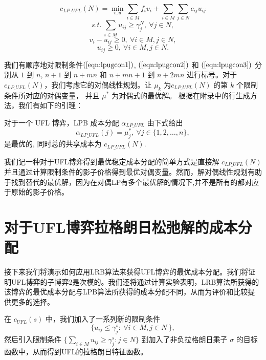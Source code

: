 \documentclass[UTF8]{article}
\begin{document}
\begin{定义}
\begin{equation*}\label{eqn:lpugobj}
c_{LP\_UFL}(N) = \min_{v,u} \sum_{i \in M} f_iv_i + \sum_{i \in M} \sum_{j \in N} c_{ij}u_{ij}
\end{equation*}
\begin{equation} \label{eqn:lpugcon1}
s.t.~\sum_{i \in M} u_{ij} \geq \gamma_j^N, ~\forall j \in N,
\end{equation}
\begin{equation}\label{eqn:lpugcon2}
v_i - u_{ij} \geq 0, ~\forall i \in M, j \in N,
\end{equation}
\begin{equation}\label{eqn:lpugcon3}
u_{ij} \geq 0, ~\forall i \in M, j \in N.
\end{equation}

我们有顺序地对限制条件$(\ref{eqn:lpugcon1})$, $(\ref{eqn:lpugcon2})$ 和 $(\ref{eqn:lpugcon3})$ 分别从 $1$ 到 $n$, $n+1$ 到 $n+mn$ 和 $n+mn+1$ 到 $n+2mn$ 进行标号。对于 $c_{LP\_UFL}(N)$，我们考虑它的对偶线性规划。让 $\mu_k$ 为$c_{LP\_UFL}(N)$ 的第 $k$ 个限制条件所对应的对偶变量， 并且 $\mu^*$ 为对偶式的最优解。
根据在附录中的行生成方法，我们有如下的引理：

\begin{lemma}\label{lemma:lpbcaufl}
对于一个 UFL 博弈，LPB 成本分配 $\alpha_{LP\_UFL}$ 由下式给出
\begin{equation*}
\alpha_{LP\_UFL}(j) = \mu_j^*, ~\forall j \in \big\{1,2,\ldots,n\big\},
\end{equation*}
是最优的, 同时总的共享成本为 $c_{LP\_UFL}(N)$.
\end{lemma}

我们记一种对于UFL博弈得到最优稳定成本分配的简单方式是直接解 $c_{LP\_UFL}(N)$ 并且通过计算限制条件的影子价格得到最优对偶变量。然而，解对偶线性规划有助于找到替代的最优解，因为在对偶LP有多个最优解的情况下,并不是所有的都对应于原始的影子价格。

\section{对于UFL博弈拉格朗日松弛解的成本分配}
接下来我们将演示如何应用LRB算法来获得UFL博弈的最优成本分配。我们将证明UFL博弈的子博弈2是次模的。我们还将通过计算实验表明，LRB算法所获得的该博弈的最优成本分配与LPB算法所获得的成本分配不同，从而为评价和比较提供更多的选择。

在 $c_{UFL}(s)$ 中，我们加入了一系列新的限制条件
\begin{equation}\label{eqn:UFLLRBC}
\big\{ u_{ij} \leq \gamma_j^s: ~\forall i \in M, j \in N\ \big\},
\end{equation}
然后引入限制条件 $\{ \sum_{i \in M} u_{ij} \geq \gamma_j^s:j \in N \}$ 到加入了非负拉格朗日乘子 $\sigma$ 的目标函数中，从而得到UFL的拉格朗日特征函数。


\end{定义}
\end{document}

